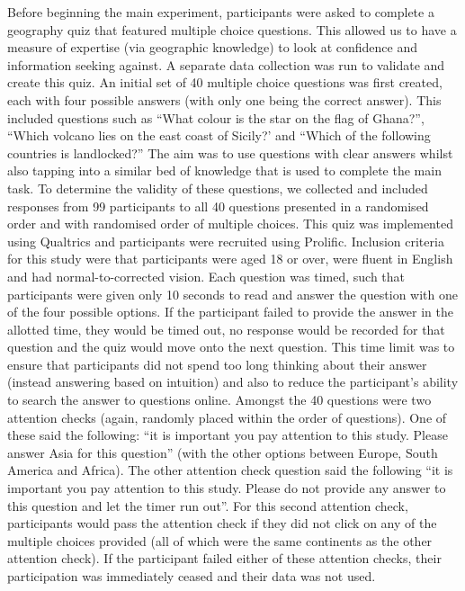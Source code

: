 \documentclass[a4paper, nobind]{templates/ociamthesis}
\begin{document}
Before beginning the main experiment, participants were asked to complete a geography quiz that featured multiple choice questions. This allowed us to have a measure of expertise (via geographic knowledge) to look at confidence and information seeking against. A separate data collection was run to validate and create this quiz. An initial set of 40 multiple choice questions was first created, each with four possible answers (with only one being the correct answer). This included questions such as ``What colour is the star on the flag of Ghana?'', ``Which volcano lies on the east coast of Sicily?' and ``Which of the following countries is landlocked?'' The aim was to use questions with clear answers whilst also tapping into a similar bed of knowledge that is used to complete the main task. To determine the validity of these questions, we collected and included responses from 99 participants to all 40 questions presented in a randomised order and with randomised order of multiple choices. This quiz was implemented using Qualtrics and participants were recruited using Prolific. Inclusion criteria for this study were that participants were aged 18 or over, were fluent in English and had normal-to-corrected vision. Each question was timed, such that participants were given only 10 seconds to read and answer the question with one of the four possible options. If the participant failed to provide the answer in the allotted time, they would be timed out, no response would be recorded for that question and the quiz would move onto the next question. This time limit was to ensure that participants did not spend too long thinking about their answer (instead answering based on intuition) and also to reduce the participant's ability to search the answer to questions online. Amongst the 40 questions were two attention checks (again, randomly placed within the order of questions). One of these said the following: ``it is important you pay attention to this study. Please answer Asia for this question'' (with the other options between Europe, South America and Africa). The other attention check question said the following ``it is important you pay attention to this study. Please do not provide any answer to this question and let the timer run out''. For this second attention check, participants would pass the attention check if they did not click on any of the multiple choices provided (all of which were the same continents as the other attention check). If the participant failed either of these attention checks, their participation was immediately ceased and their data was not used.
\end{document}
